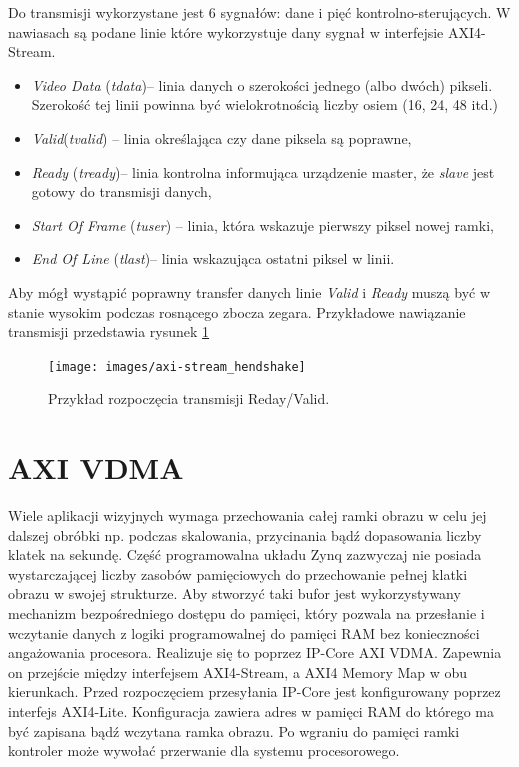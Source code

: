 Do transmisji wykorzystane jest 6 sygnałów: dane i pięć kontrolno-sterujących. W nawiasach są podane linie które wykorzystuje dany sygnał w interfejsie AXI4-Stream.
\begin{itemize}
\item \textit{Video Data} (\textit{tdata})-- linia danych o szerokości jednego (albo dwóch) pikseli. Szerokość tej linii powinna być wielokrotnością liczby osiem (16, 24, 48 itd.)
\item \textit{Valid}(\textit{tvalid}) -- linia określająca czy dane piksela są poprawne,
\item \textit{Ready} (\textit{tready})-- linia kontrolna informująca urządzenie master, że \textit{slave} jest gotowy do transmisji danych, %
\item \textit{Start Of Frame} (\textit{tuser}) -- linia, która wskazuje pierwszy piksel nowej ramki,
\item \textit{End Of Line} (\textit{tlast})-- linia wskazująca ostatni piksel w linii. %

\end{itemize}
Aby mógł wystąpić poprawny transfer danych linie \textit{Valid} i \textit{Ready} muszą być w stanie wysokim podczas rosnącego zbocza zegara. 
Przykładowe nawiązanie transmisji przedstawia rysunek \ref{fig:handshake}

\begin{figure}[h]
    \centering
    \texttt{[image: images/axi-stream\_hendshake]}
    \caption{Przykład rozpoczęcia transmisji Reday/Valid.}
    \label{fig:handshake}
\end{figure}

\section{AXI VDMA}
Wiele aplikacji wizyjnych wymaga przechowania całej ramki obrazu w celu jej dalszej obróbki np. podczas skalowania, przycinania bądź dopasowania liczby klatek na sekundę. 
Część programowalna układu Zynq zazwyczaj nie posiada wystarczającej liczby zasobów pamięciowych do przechowanie pełnej klatki obrazu w swojej strukturze. 
Aby stworzyć taki bufor jest wykorzystywany mechanizm bezpośredniego dostępu do pamięci, który pozwala na przesłanie i wczytanie danych z logiki programowalnej do pamięci RAM bez konieczności angażowania procesora. 
Realizuje się to poprzez IP-Core AXI VDMA. 
Zapewnia on przejście między interfejsem AXI4-Stream, a AXI4 Memory Map w obu kierunkach. 
Przed rozpoczęciem przesyłania IP-Core jest konfigurowany poprzez interfejs AXI4-Lite. 
Konfiguracja zawiera adres w pamięci RAM do którego ma być zapisana bądź wczytana ramka obrazu. 
Po wgraniu do pamięci ramki kontroler może wywołać przerwanie dla systemu procesorowego.
